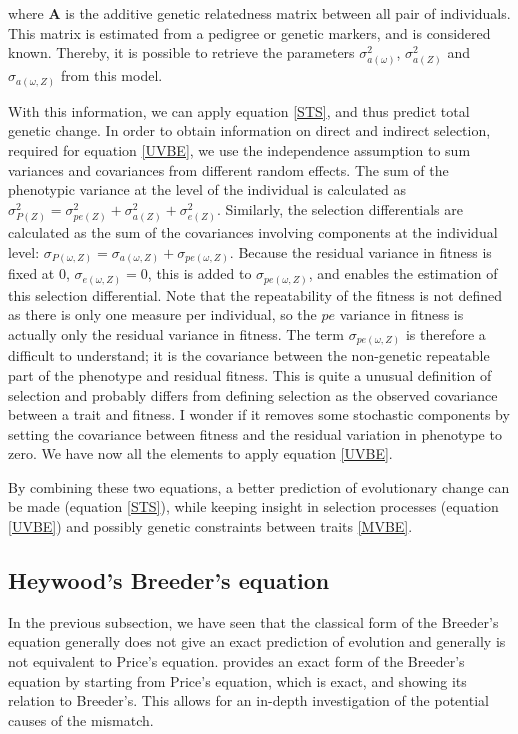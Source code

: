 where $\boldsymbol{A}$ is the additive genetic relatedness matrix between all pair of individuals. This matrix is estimated from a pedigree or genetic markers, and is considered known. Thereby, it is possible to retrieve the parameters $\sigma_{a(\omega)}^2$, $\sigma_{a(Z)}^2$ and $\sigma_{a(\omega,Z)}$ from this model.

With this information, we can apply equation \ref{STS}, and thus predict total genetic change. In order to obtain information on direct and indirect selection, required for equation \ref{UVBE}, we use the independence assumption to sum variances and covariances from different random effects. The sum of the phenotypic variance at the level of the individual is calculated as $\sigma_{P(Z)}^2= \sigma_{pe(Z)}^2+\sigma_{a(Z)}^2+\sigma_{e(Z)}^2$. Similarly, the selection differentials are calculated as the sum of the covariances involving components at the individual level: $\sigma_{P(\omega,Z)}=\sigma_{a(\omega,Z)}+\sigma_{pe(\omega,Z)}$. Because the residual variance in fitness is fixed at 0, $\sigma_{e(\omega,Z)}=0$, this is added to  $\sigma_{pe(\omega,Z)}$, and enables the estimation of this selection differential. Note that the repeatability of the fitness is not defined as there is only one measure per individual, so the $pe$ variance in fitness is actually only the residual variance in fitness. The term $\sigma_{pe(\omega,Z)}$ is therefore a difficult to understand; it is the covariance between the non-genetic repeatable part of the phenotype and residual fitness. This is quite a unusual definition of selection and probably differs from defining selection as the observed covariance between a trait and fitness. I wonder if it removes some stochastic components by setting the covariance between fitness and the residual variation in phenotype to zero.
We have now all the elements to apply equation \ref{UVBE}.

By combining these two equations, a better prediction of evolutionary change can be made (equation \ref{STS}), while keeping insight in selection processes (equation \ref{UVBE}) and possibly genetic constraints between traits \ref{MVBE}.

\subsection{Heywood's Breeder's equation}
In the previous subsection, we have seen that the classical form of the Breeder's equation generally does not give an exact prediction of evolution and generally is not equivalent to Price's equation. \citep{Heywood2005} provides an exact form of the Breeder's equation by starting from Price's equation, which is exact, and showing its relation to Breeder's. This allows for an in-depth investigation of the potential causes of the mismatch. 


